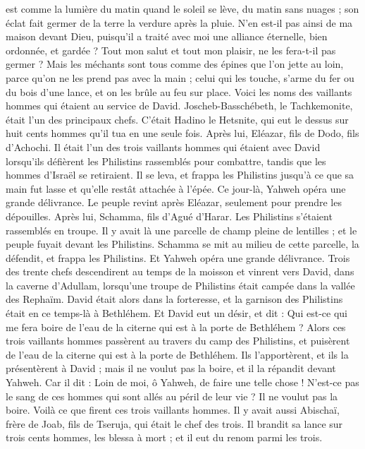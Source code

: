 \begin{multicols}{2}
est comme la lumière du matin quand le soleil se lève, du matin sans nuages ; son éclat fait germer de la terre la verdure après la pluie.
N’en est-il pas ainsi de ma maison devant Dieu, puisqu'il a traité avec moi une alliance éternelle, bien ordonnée, et gardée ? Tout mon salut et tout mon plaisir, ne les fera-t-il pas germer ?
Mais les méchants sont tous comme des épines que l’on jette au loin, parce qu'on ne les prend pas avec la main ;
celui qui les touche, s’arme du fer ou du bois d'une lance, et on les brûle au feu sur place.
Voici les noms des vaillants hommes qui étaient au service de David. Joscheb-Basschébeth, le Tachkemonite, était l’un des principaux chefs. C’était Hadino le Hetsnite, qui eut le dessus sur huit cents hommes qu'il tua en une seule fois.
Après lui, Eléazar, fils de Dodo, fils d'Achochi. Il était l'un des trois vaillants hommes qui étaient avec David lorsqu'ils défièrent les Philistins rassemblés pour combattre, tandis que les hommes d'Israël se retiraient.
Il se leva, et frappa les Philistins jusqu'à ce que sa main fut lasse et qu'elle restât attachée à l'épée. Ce jour-là, Yahweh opéra une grande délivrance. Le peuple revint après Eléazar, seulement pour prendre les dépouilles.
Après lui, Schamma, fils d'Agué d'Harar. Les Philistins s'étaient rassemblés en troupe. Il y avait là une parcelle de champ pleine de lentilles ; et le peuple fuyait devant les Philistins.
Schamma se mit au milieu de cette parcelle, la défendit, et frappa les Philistins. Et Yahweh opéra une grande délivrance.
Trois des trente chefs descendirent au temps de la moisson et vinrent vers David, dans la caverne d'Adullam, lorsqu'une troupe de Philistins était campée dans la vallée des Rephaïm.
David était alors dans la forteresse, et la garnison des Philistins était en ce temps-là à Bethléhem.
Et David eut un désir, et dit : Qui est-ce qui me fera boire de l'eau de la citerne qui est à la porte de Bethléhem ?
Alors ces trois vaillants hommes passèrent au travers du camp des Philistins, et puisèrent de l'eau de la citerne qui est à la porte de Bethléhem. Ils l’apportèrent, et ils la présentèrent à David ; mais il ne voulut pas la boire, et il la répandit devant Yahweh.
Car il dit : Loin de moi, ô Yahweh, de faire une telle chose ! N'est-ce pas le sang de ces hommes qui sont allés au péril de leur vie ? Il ne voulut pas la boire. Voilà ce que firent ces trois vaillants hommes.
Il y avait aussi Abischaï, frère de Joab, fils de Tseruja, qui était le chef des trois. Il brandit sa lance sur trois cents hommes, les blessa à mort ; et il eut du renom parmi les trois.

\end{multicols}
